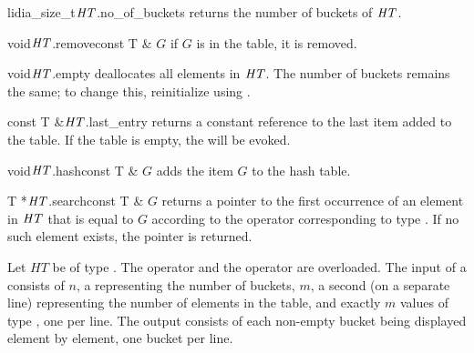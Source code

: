 \begin{cfcode}{lidia_size_t}{$\mathit{HT}$.no_of_buckets}{}
  returns the number of buckets of $\mathit{HT}$.
\end{cfcode}

\begin{fcode}{void}{$\mathit{HT}$.remove}{const T & $G$}
  if $G$ is in the table, it is removed.
\end{fcode}

\begin{fcode}{void}{$\mathit{HT}$.empty}{}
  deallocates all elements in $\mathit{HT}$.  The number of buckets remains the same; to change this,
  reinitialize using .
\end{fcode}

\begin{cfcode}{const T &}{$\mathit{HT}$.last_entry}{}
  returns a constant reference to the last item added to the table.  If the table is empty, the
  \LEH will be evoked.
\end{cfcode}

\begin{fcode}{void}{$\mathit{HT}$.hash}{const T & $G$}
  adds the item $G$ to the hash table.
\end{fcode}

\begin{cfcode}{T *}{$\mathit{HT}$.search}{const T & $G$}
  returns a pointer to the first occurrence of an element in $\mathit{HT}$ that is equal to $G$
  according to the \code{==} operator corresponding to type .  If no such element
  exists, the  pointer is returned.
\end{cfcode}



\IO

Let $HT$ be of type .  The  operator \code{>>} and the
 operator \code{<<} are overloaded.  The input of a 
consists of $n$, a  representing the number of buckets, $m$, a second
 (on a separate line) representing the number of elements in the table, and
exactly $m$ values of type , one per line.  The output consists of each non-empty bucket
being displayed element by element, one bucket per line.



\SEEALSO



